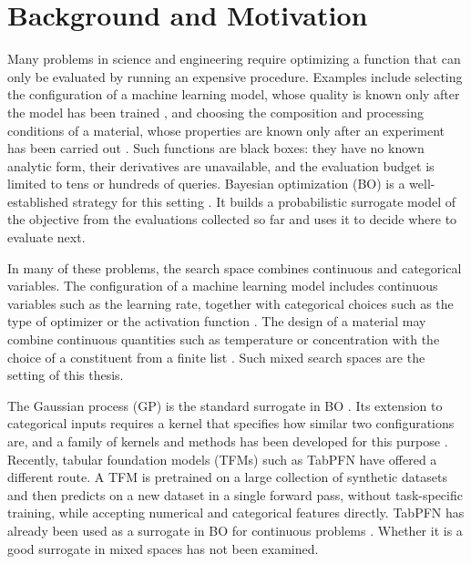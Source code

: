 

\section{Background and Motivation}

Many problems in science and engineering require optimizing a function that can only be evaluated by running an expensive procedure. Examples include selecting the configuration of a machine learning model, whose quality is known only after the model has been trained \citep{pmlr-v54-klein17a, WU201926}, and choosing the composition and processing conditions of a material, whose properties are known only after an experiment has been carried out \citep{10.1039/c9sc04026a, 10.1039/d2nr07147a}. Such functions are black boxes: they have no known analytic form, their derivatives are unavailable, and the evaluation budget is limited to tens or hundreds of queries. Bayesian optimization (BO) is a well-established strategy for this setting \citep{7352306, frazier2018tutorial}. It builds a probabilistic surrogate model of the objective from the evaluations collected so far and uses it to decide where to evaluate next.

In many of these problems, the search space combines continuous and categorical variables. The configuration of a machine learning model includes continuous variables such as the learning rate, together with categorical choices such as the type of optimizer or the activation function \citep{pmlr-v119-ru20a}. The design of a material may combine continuous quantities such as temperature or concentration with the choice of a constituent from a finite list \citep{zhang2020bayesian}. Such mixed search spaces are the setting of this thesis.

The Gaussian process (GP) is the standard surrogate in BO  \citep{rasmussen2006gaussian}. Its extension to categorical inputs requires a kernel that specifies how similar two configurations are, and a family of kernels and methods has been developed for this purpose \citep{pmlr-v119-ru20a, pmlr-v139-wan21b, pmlr-v206-deshwal23a}. Recently, tabular foundation models (TFMs) such as TabPFN \citep{hollmann2022tabpfn, hollmann2025accurate} have offered a different route. A TFM is pretrained on a large collection of synthetic datasets and then predicts on a new dataset in a single forward pass, without task-specific training, while accepting numerical and categorical features directly. TabPFN has already been used as a surrogate in BO for continuous problems \citep{ICLR2026_b54bafb9, Rogers2026}. Whether it is a good surrogate in mixed spaces has not been examined.

